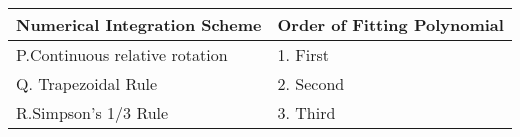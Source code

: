 \begin{tabular}{|l|l|}
\hline
\multicolumn{1}{|c|}{\textbf{Numerical Integration Scheme}}    & \multicolumn{1}{|c|}{\textbf{Order of Fitting Polynomial}} \\
\hline
P.Continuous relative rotation     & 1. First \\
\hline
Q. Trapezoidal Rule       &2. Second  \\
\hline
R.Simpson's 1/3 Rule       &3. Third  \\
\hline
\end{tabular}